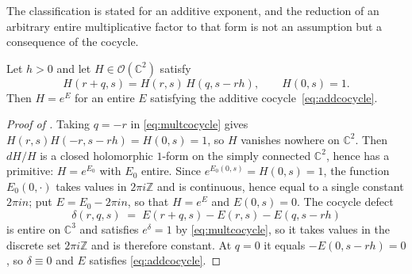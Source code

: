 \documentclass[11pt,letterpaper]{article}
\newcommand{\Zint}{\mathbb{Z}}
\newcommand{\Cc}{\mathbb{C}}
\begin{document}
The classification is stated for an additive exponent, and the reduction of an
arbitrary entire multiplicative factor to that form is not an assumption but a
consequence of the cocycle.

\begin{lemma}
\label{lem:mult2add}
Let $h>0$ and let $H\in\mathcal{O}(\Cc^{2})$ satisfy
\begin{equation}
  H(r+q,s)=H(r,s)\,H(q,s-rh),\qquad H(0,s)=1 .
  \label{eq:multcocycle}
\end{equation}
Then $H=e^{E}$ for an entire $E$ satisfying the additive
cocycle~\eqref{eq:addcocycle}.
\end{lemma}

\begin{proof}[Proof of ]
Taking $q=-r$ in \eqref{eq:multcocycle} gives $H(r,s)H(-r,s-rh)=H(0,s)=1$, so
$H$ vanishes nowhere on $\Cc^{2}$. Then $dH/H$ is a closed holomorphic $1$-form
on the simply connected $\Cc^{2}$, hence has a primitive: $H=e^{E_0}$ with $E_0$
entire. Since $e^{E_0(0,s)}=H(0,s)=1$, the function $E_0(0,\cdot)$ takes values
in $2\pi i\Zint$ and is continuous, hence equal to a single constant $2\pi in$;
put $E=E_0-2\pi in$, so that $H=e^{E}$ and $E(0,s)=0$. The cocycle defect
\begin{equation*}
  \delta(r,q,s)\;=\;E(r+q,s)-E(r,s)-E(q,s-rh)
\end{equation*}
is entire on $\Cc^{3}$ and satisfies $e^{\delta}=1$ by \eqref{eq:multcocycle},
so it takes values in the discrete set $2\pi i\Zint$ and is therefore constant.
At $q=0$ it equals $-E(0,s-rh)=0$, so $\delta\equiv0$ and $E$ satisfies
\eqref{eq:addcocycle}.
\end{proof}
\end{document}
